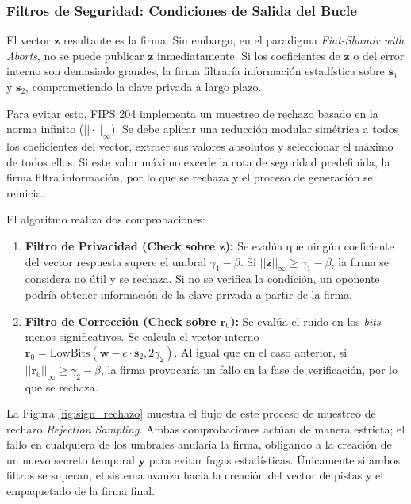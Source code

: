 \documentclass[11pt, a4paper]{report}
\theoremstyle{definition}
\begin{document}
\subsubsection{Filtros de Seguridad: Condiciones de Salida del Bucle}

El vector $\mathbf{z}$ resultante es la firma. Sin embargo, en el paradigma \textit{Fiat-Shamir with Aborts}, no se puede publicar $\mathbf{z}$ inmediatamente. Si los coeficientes de $\mathbf{z}$ o del error interno son demasiado grandes, la firma filtraría información estadística sobre $\mathbf{s}_1$ y $\mathbf{s}_2$, comprometiendo la clave privada a largo plazo.

Para evitar esto, FIPS 204 implementa un muestreo de rechazo basado en la norma infinito ($||\cdot||_\infty$). Se debe aplicar una reducción modular simétrica a todos los coeficientes del vector, extraer sus valores absolutos y seleccionar el máximo de todos ellos. Si este valor máximo excede la cota de seguridad predefinida, la firma filtra información, por lo que se rechaza y el proceso de generación se reinicia.

El algoritmo realiza dos comprobaciones:

\begin{enumerate}
    \item \textbf{Filtro de Privacidad (Check sobre $\mathbf{z}$):} Se evalúa que ningún coeficiente del vector respuesta supere el umbral $\gamma_1 - \beta$. Si $|| \mathbf{z} ||_\infty \ge \gamma_1 - \beta$, la firma se considera no útil y se rechaza. Si no se verifica la condición, un oponente podría obtener información de la clave privada a partir de la firma.
    
    \item \textbf{Filtro de Corrección (Check sobre $\mathbf{r}_0$):} Se evalúa el ruido en los \textit{bits} menos significativos. Se calcula el vector interno $\mathbf{r}_0 = \text{LowBits}(\mathbf{w} - c \cdot \mathbf{s}_2, 2\gamma_2)$. Al igual que en el caso anterior, si $|| \mathbf{r}_0 ||_\infty \ge \gamma_2 - \beta$, la firma provocaría un fallo en la fase de verificación, por lo que se rechaza.
\end{enumerate}

La Figura \ref{fig:sign_rechazo} muestra el flujo de este proceso de muestreo de rechazo \textit{Rejection Sampling}. Ambas comprobaciones actúan de manera estricta; el fallo en cualquiera de los umbrales anularía la firma, obligando a la creación de un nuevo secreto temporal $\mathbf{y}$ para evitar fugas estadísticas. Únicamente si ambos filtros se superan, el sistema avanza hacia la creación del vector de pistas y el empaquetado de la firma final.
\end{document}
